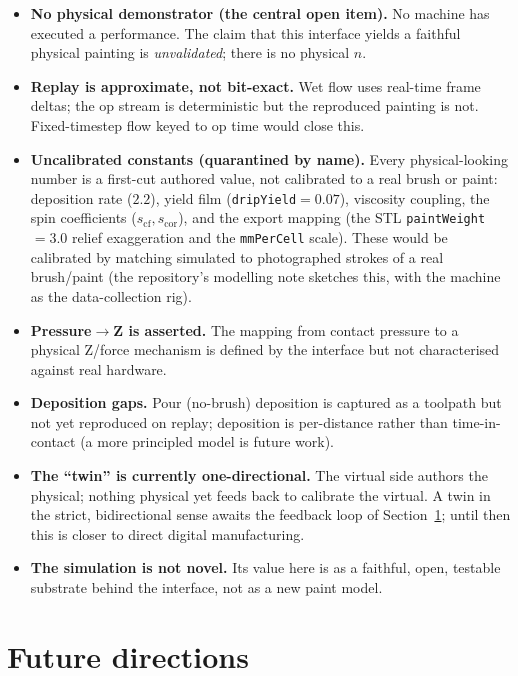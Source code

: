 \documentclass[11pt]{article}
\newcommand{\code}[1]{\texttt{\small #1}}
\begin{document}
\begin{itemize}
\item \textbf{No physical demonstrator (the central open item).} No machine has
  executed a performance. The claim that this interface yields a faithful
  physical painting is \emph{unvalidated}; there is no physical $n$.
\item \textbf{Replay is approximate, not bit-exact.} Wet flow uses real-time
  frame deltas; the op stream is deterministic but the reproduced painting is
  not. Fixed-timestep flow keyed to op time would close this.
\item \textbf{Uncalibrated constants (quarantined by name).} Every physical-looking
  number is a first-cut authored value, not calibrated to a real brush or paint:
  deposition rate ($2.2$), yield film (\code{dripYield}$=0.07$), viscosity
  coupling, the spin coefficients ($s_{\mathrm{cf}},s_{\mathrm{cor}}$), and the
  export mapping (the STL \code{paintWeight}$=3.0$ relief exaggeration and the
  \code{mmPerCell} scale). These would be calibrated by matching simulated to
  photographed strokes of a real brush/paint (the repository's modelling note
  sketches this, with the machine as the data-collection rig).
\item \textbf{Pressure$\rightarrow$Z is asserted.} The mapping from contact
  pressure to a physical Z/force mechanism is defined by the interface but not
  characterised against real hardware.
\item \textbf{Deposition gaps.} Pour (no-brush) deposition is captured as a
  toolpath but not yet reproduced on replay; deposition is per-distance rather
  than time-in-contact (a more principled model is future work).
\item \textbf{The ``twin'' is currently one-directional.} The virtual side
  authors the physical; nothing physical yet feeds back to calibrate the virtual.
  A twin in the strict, bidirectional sense
  \citep{grieves2017twin,glaessgen2012twin} awaits the feedback loop of
  Section~\ref{sec:future}; until then this is closer to direct digital
  manufacturing.
\item \textbf{The simulation is not novel.} Its value here is as a faithful,
  open, testable substrate behind the interface, not as a new paint model.
\end{itemize}

\section{Future directions}
\label{sec:future}
\end{document}
